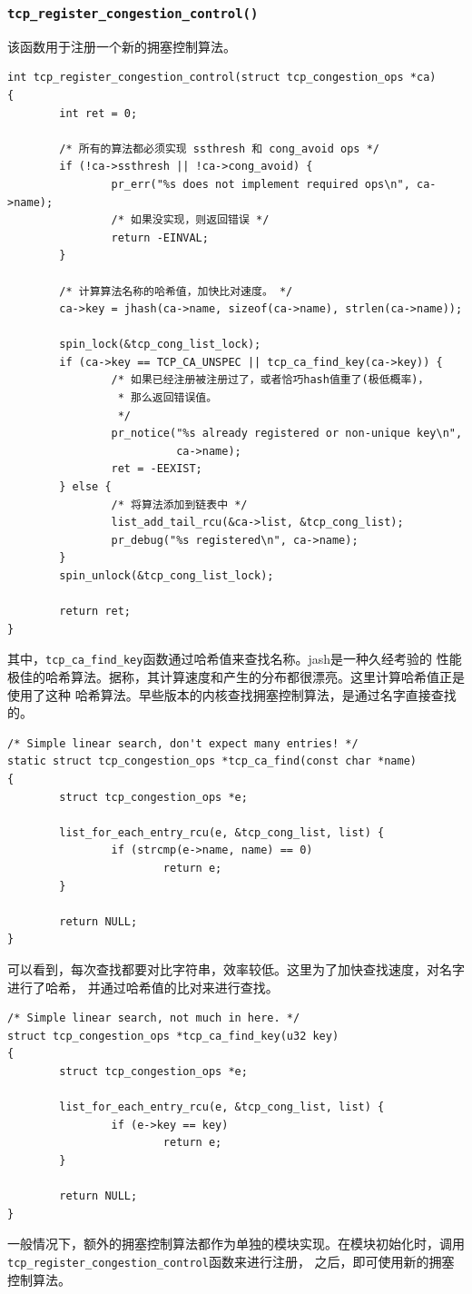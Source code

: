 \subsubsection{\texttt{tcp_register_congestion_control()}}
该函数用于注册一个新的拥塞控制算法。
\begin{verbatim}
int tcp_register_congestion_control(struct tcp_congestion_ops *ca)
{
        int ret = 0;

        /* 所有的算法都必须实现 ssthresh 和 cong_avoid ops */
        if (!ca->ssthresh || !ca->cong_avoid) {
                pr_err("%s does not implement required ops\n", ca->name);
                /* 如果没实现，则返回错误 */
                return -EINVAL;
        }

        /* 计算算法名称的哈希值，加快比对速度。 */
        ca->key = jhash(ca->name, sizeof(ca->name), strlen(ca->name));

        spin_lock(&tcp_cong_list_lock);
        if (ca->key == TCP_CA_UNSPEC || tcp_ca_find_key(ca->key)) {
                /* 如果已经注册被注册过了，或者恰巧hash值重了(极低概率)，
                 * 那么返回错误值。
                 */
                pr_notice("%s already registered or non-unique key\n",
                          ca->name);
                ret = -EEXIST;
        } else {
                /* 将算法添加到链表中 */
                list_add_tail_rcu(&ca->list, &tcp_cong_list);
                pr_debug("%s registered\n", ca->name);
        }
        spin_unlock(&tcp_cong_list_lock);

        return ret;
}
\end{verbatim}
其中，\texttt{tcp_ca_find_key}函数通过哈希值来查找名称。jash是一种久经考验的
性能极佳的哈希算法。据称，其计算速度和产生的分布都很漂亮。这里计算哈希值正是使用了这种
哈希算法。早些版本的内核查找拥塞控制算法，是通过名字直接查找的。
\begin{verbatim}
/* Simple linear search, don't expect many entries! */
static struct tcp_congestion_ops *tcp_ca_find(const char *name)
{
        struct tcp_congestion_ops *e;

        list_for_each_entry_rcu(e, &tcp_cong_list, list) {
                if (strcmp(e->name, name) == 0)
                        return e;
        }

        return NULL;
}
\end{verbatim}
可以看到，每次查找都要对比字符串，效率较低。这里为了加快查找速度，对名字进行了哈希，
并通过哈希值的比对来进行查找。
\begin{verbatim}
/* Simple linear search, not much in here. */
struct tcp_congestion_ops *tcp_ca_find_key(u32 key)
{
        struct tcp_congestion_ops *e;

        list_for_each_entry_rcu(e, &tcp_cong_list, list) {
                if (e->key == key)
                        return e;
        }

        return NULL;
}
\end{verbatim}
一般情况下，额外的拥塞控制算法都作为单独的模块实现。在模块初始化时，调用
\texttt{tcp_register_congestion_control}函数来进行注册，
之后，即可使用新的拥塞控制算法。

